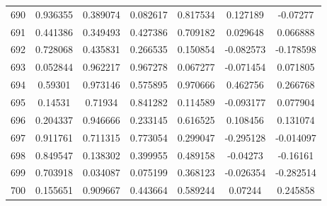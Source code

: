 \begin{table}
\begin{tabular}{c|c|c|c|c|c|c}
690 & 0.936355 & 0.389074 & 0.082617 & 0.817534 & 0.127189 & -0.07277\\
691 & 0.441386 & 0.349493 & 0.427386 & 0.709182 & 0.029648 & 0.066888\\
692 & 0.728068 & 0.435831 & 0.266535 & 0.150854 & -0.082573 & -0.178598\\
693 & 0.052844 & 0.962217 & 0.967278 & 0.067277 & -0.071454 & 0.071805\\
694 & 0.59301 & 0.973146 & 0.575895 & 0.970666 & 0.462756 & 0.266768\\
695 & 0.14531 & 0.71934 & 0.841282 & 0.114589 & -0.093177 & 0.077904\\
696 & 0.204337 & 0.946666 & 0.233145 & 0.616525 & 0.108456 & 0.131074\\
697 & 0.911761 & 0.711315 & 0.773054 & 0.299047 & -0.295128 & -0.014097\\
698 & 0.849547 & 0.138302 & 0.399955 & 0.489158 & -0.04273 & -0.16161\\
699 & 0.703918 & 0.034087 & 0.075199 & 0.368123 & -0.026354 & -0.282514\\
700 & 0.155651 & 0.909667 & 0.443664 & 0.589244 & 0.07244 & 0.245858\\
\end{tabular}
\end{table}
\newpage
